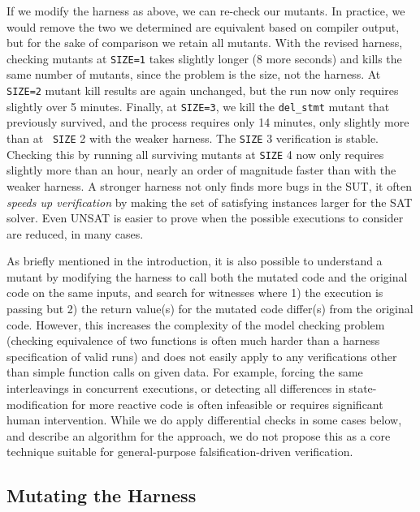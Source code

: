 \documentclass[conference]{IEEEtran}
\begin{document}
If we modify the harness as above, we can re-check our mutants.  In
practice, we would remove the two we determined are equivalent based
on compiler output, but for the sake of comparison we retain all
mutants.  With the revised harness, checking mutants at {\tt SIZE=1}
takes slightly longer (8 more seconds) and kills the same number of
mutants, since the problem is the size, not the harness.  At {\tt
  SIZE=2} mutant kill results are again unchanged, but the run now
only requires slightly over 5 minutes.  Finally, at {\tt SIZE=3}, we
kill the {\tt del\_stmt} mutant that previously survived, and the
process requires only 14 minutes, only slightly more than at {\tt
  SIZE} 2 with the weaker harness.  The {\tt SIZE} 3 verification is
stable.  Checking this by running all surviving mutants at {\tt SIZE}
4 now only requires slightly more than an hour, nearly an order of
magnitude faster than with the weaker harness.  A stronger harness not
only finds more bugs in the SUT, it often \emph{speeds up
  verification} by making the set of satisfying instances larger for
the SAT solver.  Even UNSAT is easier to prove when the possible
executions to consider are reduced, in many cases.

As briefly mentioned in the introduction, it is also possible to
understand a mutant by modifying the harness to call both the mutated
code and the original code on the same inputs, and search for
witnesses where 1) the execution is passing but 2) the return value(s)
for the mutated code differ(s) from the original code.  However, this
increases the complexity of the model checking problem (checking
equivalence of two functions is often much harder than a harness
specification of valid runs) and does not easily apply to any verifications other
than simple function calls on given data.  For example, forcing the
same interleavings in concurrent executions, or detecting all
differences in state-modification for more reactive code is often
infeasible or requires significant human intervention.  While we do
apply differential checks in some cases below, and describe an
algorithm for the approach, we do not propose this as a core technique
suitable for general-purpose falsification-driven verification.

\subsection{Mutating the Harness}
\end{document}
